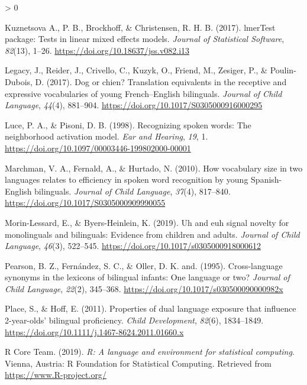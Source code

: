 \documentclass[
  english,
  ,man,floatsintext]{apa6}
\newlength{\cslhangindent}
\newenvironment{CSLReferences}[2] %
 {%
  \setlength{\parindent}{0pt}
  \ifodd #1 \everypar{\setlength{\hangindent}{\cslhangindent}}\ignorespaces\fi
  \ifnum #2 > 0
  \setlength{\parskip}{#2\baselineskip}
  \fi
 }%
 {}
\begin{document}
\begin{CSLReferences}{1}{0}
\leavevmode\hypertarget{ref-Kuznetsova_etal_2017}{}%
Kuznetsova A., P. B., Brockhoff, \& Christensen, R. H. B. (2017). lmerTest package: Tests in linear mixed effects models. \emph{Journal of Statistical Software}, \emph{82}(13), 1--26. \url{https://doi.org/10.18637/jss.v082.i13}

\leavevmode\hypertarget{ref-Legacy_etal_2017}{}%
Legacy, J., Reider, J., Crivello, C., Kuzyk, O., Friend, M., Zesiger, P., \& Poulin-Dubois, D. (2017). Dog or chien? Translation equivalents in the receptive and expressive vocabularies of young {F}rench--{E}nglish bilinguals. \emph{Journal of Child Language}, \emph{44}(4), 881--904. \url{https://doi.org/10.1017/S0305000916000295}

\leavevmode\hypertarget{ref-Luce_Pisoni_1998}{}%
Luce, P. A., \& Pisoni, D. B. (1998). Recognizing spoken words: The neighborhood activation model. \emph{Ear and Hearing}, \emph{19}, 1. \url{https://doi.org/10.1097/00003446-199802000-00001}

\leavevmode\hypertarget{ref-Marchman_etal_2010}{}%
Marchman, V. A., Fernald, A., \& Hurtado, N. (2010). How vocabulary size in two languages relates to efficiency in spoken word recognition by young {S}panish-{E}nglish bilinguals. \emph{Journal of Child Language}, \emph{37}(4), 817--840. \url{https://doi.org/10.1017/S0305000909990055}

\leavevmode\hypertarget{ref-Morin-Lessard_Byers-Heinlein_2019}{}%
Morin-Lessard, E., \& Byers-Heinlein, K. (2019). Uh and euh signal novelty for monolinguals and bilinguals: Evidence from children and adults. \emph{Journal of Child Language}, \emph{46}(3), 522--545. \url{https://doi.org/10.1017/s0305000918000612}

\leavevmode\hypertarget{ref-Pearson_etal_1995}{}%
Pearson, B. Z., Fernández, S. C., \& Oller, D. K. and. (1995). Cross-language synonyms in the lexicons of bilingual infants: One language or two? \emph{Journal of Child Language}, \emph{22}(2), 345--368. \url{https://doi.org/10.1017/s030500090000982x}

\leavevmode\hypertarget{ref-Place_Hoff_2011}{}%
Place, S., \& Hoff, E. (2011). Properties of dual language exposure that influence 2-year-olds' bilingual proficiency. \emph{Child Development}, \emph{82}(6), 1834--1849. \url{https://doi.org/10.1111/j.1467-8624.2011.01660.x}

\leavevmode\hypertarget{ref-R_2019}{}%
R Core Team. (2019). \emph{R: A language and environment for statistical computing}. Vienna, Austria: R Foundation for Statistical Computing. Retrieved from \url{https://www.R-project.org/}


\end{CSLReferences}
\end{document}

